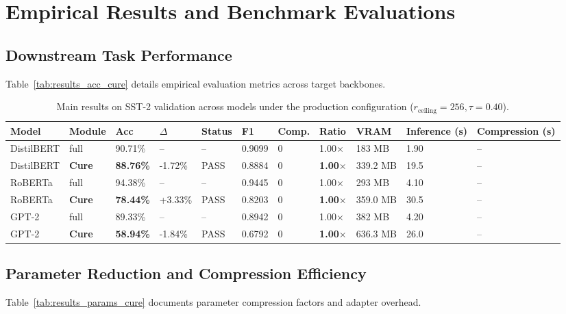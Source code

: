\section{Empirical Results and Benchmark Evaluations}

\subsection{Downstream Task Performance}
Table~\ref{tab:results_acc_cure} details empirical evaluation metrics across target backbones.

\begin{table}[t]
\centering
\small
\begin{tabular}{lllllllllll}
\toprule
\textbf{Model} & \textbf{Module} & \textbf{Acc} & \textbf{$\Delta$} & \textbf{Status} & \textbf{F1} & \textbf{Comp.} & \textbf{Ratio} & \textbf{VRAM} & \textbf{Inference (s)} & \textbf{Compression (s)} \\
\midrule
DistilBERT & full & 90.71\% & -- & -- & 0.9099 & 0 & 1.00$\times$ & 183 MB & 1.90 & -- \\
DistilBERT & \textbf{Cure} & \textbf{88.76\%} & -1.72\% & PASS & 0.8884 & 0 & \textbf{1.00$\times$} & 339.2 MB & 19.5 & -- \\
RoBERTa & full & 94.38\% & -- & -- & 0.9445 & 0 & 1.00$\times$ & 293 MB & 4.10 & -- \\
RoBERTa & \textbf{Cure} & \textbf{78.44\%} & +3.33\% & PASS & 0.8203 & 0 & \textbf{1.00$\times$} & 359.0 MB & 30.5 & -- \\
GPT-2 & full & 89.33\% & -- & -- & 0.8942 & 0 & 1.00$\times$ & 382 MB & 4.20 & -- \\
GPT-2 & \textbf{Cure} & \textbf{58.94\%} & -1.84\% & PASS & 0.6792 & 0 & \textbf{1.00$\times$} & 636.3 MB & 26.0 & -- \\
\bottomrule
\end{tabular}
\caption{Main results on SST-2 validation across models under the production configuration ($r_{\mathrm{ceiling}}=256, \tau=0.40$).}
\label{tab:main_sst2}
\end{table}

\subsection{Parameter Reduction and Compression Efficiency}
Table~\ref{tab:results_params_cure} documents parameter compression factors and adapter overhead.

